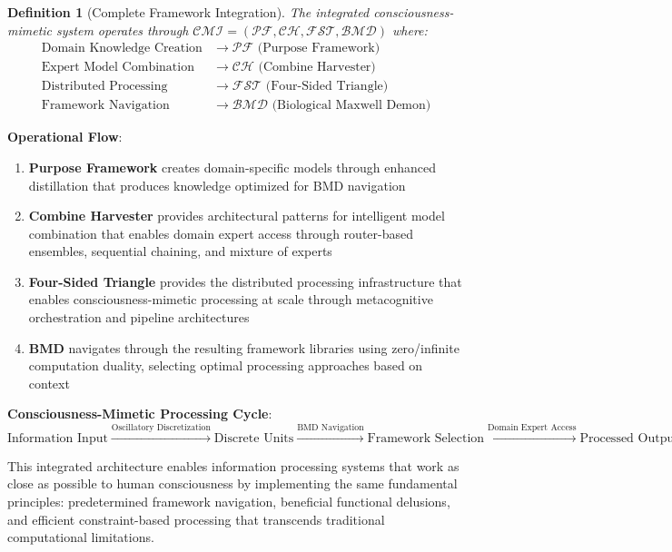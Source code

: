 \documentclass[12pt,a4paper]{article}
\newtheorem{definition}[theorem]{Definition}
\begin{document}
{{{\begin{definition}[Complete Framework Integration]
The integrated consciousness-mimetic system operates through $\mathcal{CMI} = (\mathcal{PF}, \mathcal{CH}, \mathcal{FST}, \mathcal{BMD})$ where:
\begin{align}
\text{Domain Knowledge Creation} &\rightarrow \mathcal{PF} \text{ (Purpose Framework)} \\
\text{Expert Model Combination} &\rightarrow \mathcal{CH} \text{ (Combine Harvester)} \\
\text{Distributed Processing} &\rightarrow \mathcal{FST} \text{ (Four-Sided Triangle)} \\
\text{Framework Navigation} &\rightarrow \mathcal{BMD} \text{ (Biological Maxwell Demon)}
\end{align}
\end{definition}

\textbf{Operational Flow}:
\begin{enumerate}
\item \textbf{Purpose Framework} creates domain-specific models through enhanced distillation that produces knowledge optimized for BMD navigation
\item \textbf{Combine Harvester} provides architectural patterns for intelligent model combination that enables domain expert access through router-based ensembles, sequential chaining, and mixture of experts
\item \textbf{Four-Sided Triangle} provides the distributed processing infrastructure that enables consciousness-mimetic processing at scale through metacognitive orchestration and pipeline architectures
\item \textbf{BMD} navigates through the resulting framework libraries using zero/infinite computation duality, selecting optimal processing approaches based on context
\end{enumerate}

\textbf{Consciousness-Mimetic Processing Cycle}:
$$\text{Information Input} \xrightarrow{\text{Oscillatory Discretization}} \text{Discrete Units} \xrightarrow{\text{BMD Navigation}} \text{Framework Selection} \xrightarrow{\text{Domain Expert Access}} \text{Processed Output}$$

This integrated architecture enables information processing systems that work as close as possible to human consciousness by implementing the same fundamental principles: predetermined framework navigation, beneficial functional delusions, and efficient constraint-based processing that transcends traditional computational limitations.

}}}
\end{document}
